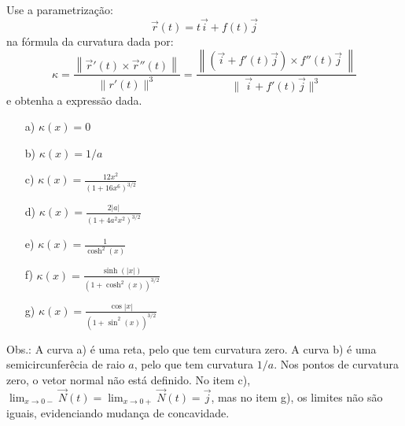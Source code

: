 \begin{resol}
  Use a parametrização:
 $$\vec{r}(t) = t\vec{i}+f(t)\vec{j}$$ na fórmula da curvatura dada por:
$$\kappa=\frac{\left\|\vec{r}'(t)\times \vec{r}''(t)\right\|}{\|r'(t)\|^3}=\frac{\left\|\left(\vec{i}+f'(t)\vec{j}\right)\times f''(t)\vec{j}~\!\right\|}{\|~\!\vec{i}+f'(t)\vec{j}\|^3}$$
e obtenha a expressão dada.


\begin{itemize}
\item[a)] $\kappa(x)=0$
\item[b)]$\kappa(x)=1/a$
\item[c)] $\kappa(x)=\frac{12x^2}{\left(1+16x^6\right)^{3/2}}$
\item[d)] $\kappa(x)=\frac{2|a|}{\left(1+4a^2x^2\right)^{3/2}}$
\item[e)] $\kappa(x)=\frac{1}{\cosh^2(x)}$
\item[f)] $\kappa(x)=\frac{\sinh(|x|)}{\left(1+\cosh^2(x)\right)^{3/2}}$
\item[g)] $\kappa(x)=\frac{\cos|x|}{\left(1+\sin^2(x)\right)^{3/2}}$
\end{itemize}

Obs.: A curva a) é uma reta, pelo que tem curvatura zero. A curva b) é uma semicircunferêcia de raio $a$, pelo que tem curvatura $1/a$. Nos pontos de curvatura zero, o vetor normal não está definido.
No item c), $\lim_{x\to 0-}\vec{N}(t)=\lim_{x\to 0+}\vec{N}(t)=\vec{j}$, mas no item g), os limites não são iguais, evidenciando mudança de concavidade.



\end{resol}
